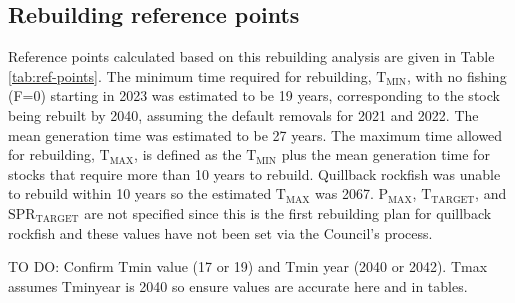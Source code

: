 \documentclass[11pt,
  english,
  a4paper,
]{article}
\begin{document}
\leavevmode\tagmcend\tagstructend


\hypertarget{rebuilding-reference-points}{%
\subsection{Rebuilding reference points}\label{rebuilding-reference-points}}

\leavevmode\tagmcend\tagstructend


Reference points calculated based on this rebuilding analysis are given in Table \ref{tab:ref-points}. The minimum time required for rebuilding, {\(\text{T}_\text{MIN}\)\leavevmode\tagmcend\tagstructend}, with no fishing (F=0) starting in 2023 was estimated to be 19 years, corresponding to the stock being rebuilt by 2040, assuming the default removals for 2021 and 2022. The mean generation time was estimated to be 27 years. The maximum time allowed for rebuilding, {\(\text{T}_\text{MAX}\)\leavevmode\tagmcend\tagstructend}, is defined as the {\(\text{T}_\text{MIN}\)\leavevmode\tagmcend\tagstructend} plus the mean generation time for stocks that require more than 10 years to rebuild. Quillback rockfish was unable to rebuild within 10 years so the estimated {\(\text{T}_\text{MAX}\)\leavevmode\tagmcend\tagstructend} was 2067. {\(\text{P}_\text{MAX}\)\leavevmode\tagmcend\tagstructend}, {\(\text{T}_\text{TARGET}\)\leavevmode\tagmcend\tagstructend}, and {\(\text{SPR}_\text{TARGET}\)\leavevmode\tagmcend\tagstructend} are not specified since this is the first rebuilding plan for quillback rockfish and these values have not been set via the Council's process.

\leavevmode\tagmcend\tagstructend\par


TO DO: Confirm Tmin value (17 or 19) and Tmin year (2040 or 2042). Tmax assumes Tminyear is 2040 so ensure values are accurate here and in tables.
\end{document}
